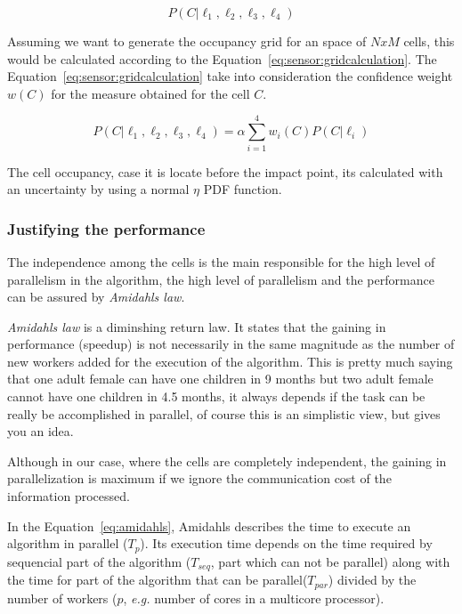 \begin{equation}
\label{eq:sensor:lidarfusion}
P(C|\ell_1,\ell_2,\ell_3,\ell_4)
\end{equation}

Assuming we want to generate the occupancy grid for an space of $NxM$ cells, this would be calculated according to the Equation~\ref{eq:sensor:gridcalculation}. The Equation~\ref{eq:sensor:gridcalculation} take into consideration the confidence weight $w(C)$ for the measure obtained for the cell $C$.

\begin{equation}
\label{eq:sensor:gridcalculation}
P(C|\ell_1,\ell_2,\ell_3,\ell_4)=\alpha \sum_{i=1}^{4} w_i(C)P(C|\ell_i)
\end{equation}

The cell occupancy, case it is locate before the impact point, its calculated with an uncertainty by using a normal $\eta$ PDF function. 



\subsubsection{Justifying the performance}

The independence among the cells is the main responsible for the high level of parallelism in the algorithm, the high level of parallelism and the performance can be assured by \textit{Amidahls law}.

\textit{Amidahls law} is a diminshing return law. It states that the gaining in performance (speedup) is not necessarily in the same magnitude as the number of new workers added for the execution of the algorithm\cite{Amdahl:1967:VSP:1465482.1465560}. This is pretty much saying that one adult female can have one children in 9 months but two adult female cannot have one children in 4.5 months, it always depends if the task can be really be accomplished in parallel, of course this is an simplistic view, but gives you an idea.

Although in our case, where the cells are completely independent, the gaining in parallelization is maximum if we ignore the communication cost of the information processed.

In the Equation~\ref{eq:amidahls}, Amidahls describes the time to execute an algorithm in parallel ($T_p$). Its execution time depends on the time required by sequencial part of the algorithm ($T_{seq}$, part which can not be parallel) along with the time for part of the algorithm that can be parallel($T_{par}$) divided by the number of workers ($p$, \textit{e.g.} number of cores in a multicore processor).

